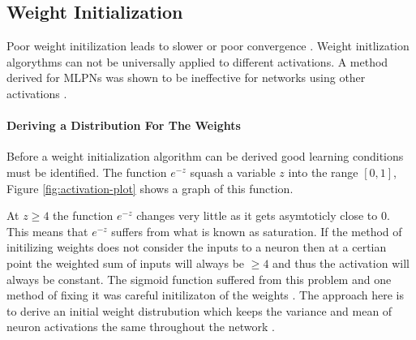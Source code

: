 \subsection{Weight Initialization}
Poor weight initilization leads to slower or poor convergence \cite{mishkin2015all}. Weight initlization algorythms can not be universally applied to different activations. A method derived for MLPNs was shown to be ineffective for networks using other activations \cite{he2015delving}.

\paragraph{Deriving a Distribution For The Weights}
Before a weight initialization algorithm can be derived good learning conditions must be identified. The function $e^{-z}$ squash a variable $z$ into the range $[0,1]$, Figure \ref{fig:activation-plot} shows a graph of this function.\\
\noindent
\begin{minipage}[t]{0.55\textwidth}
\vspace{0px}
At $z \geq 4$ the function $e^{-z}$ changes very little as it gets asymtoticly close to 0. This means that $e^{-z}$ suffers from what is known as saturation. If the method of initilizing weights does not consider the inputs to a neuron then at a certian point the weighted sum of inputs will always be $\geq 4$ and thus the activation will always be constant. The sigmoid function suffered from this problem and one method of fixing it was careful initilizaton of the weights \cite{glorot2010understanding}. The approach here is to derive an initial weight distrubution which keeps the variance and mean of neuron activations the same throughout the network \cite{kumar2017weight}. \\
\end{minipage}
\hspace{0.05\textwidth}

